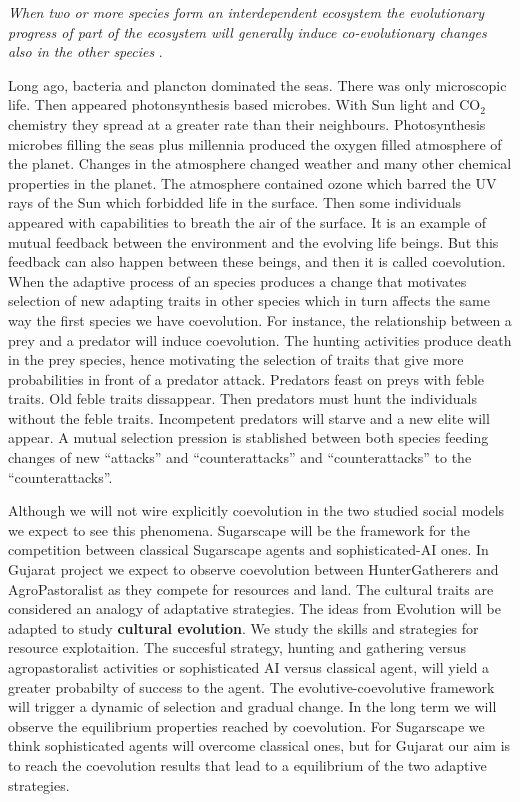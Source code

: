 \documentclass[11pt,oneside,a4paper,openright]{report}
\begin{document}
\textit{When two or more species form an interdependent ecosystem the evolutionary progress of part of the ecosystem will generally induce co-evolutionary changes also in the other species} \cite[p.154]{Gross2008}.

Long ago, bacteria and plancton dominated the seas. There was only microscopic life. Then appeared photonsynthesis
based microbes. With Sun light and CO$_2$ chemistry they spread at a greater rate than their neighbours. Photosynthesis
microbes filling the seas plus millennia produced the oxygen filled atmosphere of the planet. Changes in the atmosphere
changed weather and many other chemical properties in the planet. The atmosphere contained ozone which barred the 
UV rays of the Sun which forbidded life in the surface. Then some individuals appeared with capabilities to
breath the air of the surface. It is an example of mutual feedback between the environment and the evolving life beings. 
But this feedback can also happen between these beings, and then it is called coevolution\cite{Dawkins1990}.
When the adaptive process of an species produces a change that motivates selection of new adapting traits in other
species which in turn affects the same way the first species we have coevolution. For instance, the relationship 
between a prey and a predator will induce coevolution. The hunting activities produce death in the prey species, hence
motivating the selection of traits that give more probabilities in front of a predator attack. Predators feast on preys 
with feble traits. Old feble traits dissappear. Then predators must hunt the individuals without the feble traits. Incompetent predators will starve and a new elite will appear. A mutual selection pression is stablished between both species feeding changes of new ``attacks'' and ``counterattacks'' and ``counterattacks'' to the ``counterattacks''.

Although we will not wire explicitly coevolution in the two studied social models we expect to see this phenomena. Sugarscape will be the framework for the competition between classical Sugarscape agents and sophisticated-AI ones. In Gujarat project we expect to observe coevolution between HunterGatherers and AgroPastoralist as they compete for resources and land. The cultural traits are considered an analogy of adaptative strategies. The ideas from Evolution will be adapted to study \textbf{cultural evolution}. We study the skills and strategies for resource explotaition. The succesful strategy, hunting and gathering versus agropastoralist activities or sophisticated AI versus classical agent, will yield a greater probabilty of success to the agent. The evolutive-coevolutive framework will trigger a dynamic of selection and gradual change. In the long term we will observe the equilibrium properties reached by coevolution. For Sugarscape we think sophisticated agents will overcome classical ones, but for Gujarat our aim is to reach the coevolution results that lead to a equilibrium of the two adaptive strategies. \\  
\end{document}
